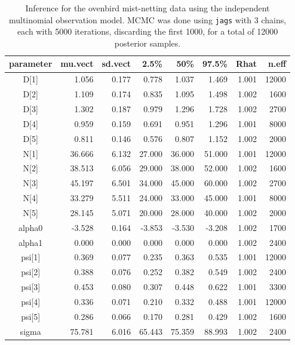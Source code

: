 \begin{table}[t!]
\centering
  \small
  \caption{Inference for the ovenbird mist-netting data using the
    independent multinomial observation model. MCMC was done using
    {\tt jags} with 3 chains, each with 5000 iterations, discarding
    the first 1000, for a total of 12000 posterior samples.}
  \begin{tabular}[t]{crrrrrrr}
    \hline \hline
parameter   &  mu.vect &  sd.vect &  2.5\%  &  50\%  &  97.5\%  & Rhat &  n.eff \\
    \hline
D[1] &   1.056  &  0.177 &  0.778 &  1.037 &  1.469 &  1.001 & 12000 \\
D[2] &    1.109 &  0.174 &  0.835 &  1.095 &  1.498 &  1.002 &  1600 \\
D[3] &    1.302 &  0.187 &  0.979 &  1.296 &  1.728 &  1.002 &  2700 \\
D[4] &    0.959 &  0.159 &  0.691 &  0.951 &  1.296 &  1.001 &  8000 \\
D[5] &    0.811 &  0.146 &  0.576 &  0.807 &  1.152 & 1.002  &  2000 \\
N[1] &   36.666 &  6.132 &  27.000 &  36.000 &  51.000 &  1.001 &  12000 \\
N[2] &   38.513 &  6.056 & 29.000  &  38.000 &  52.000 & 1.002 &  1600 \\
N[3] &   45.197 &  6.501 & 34.000 &  45.000  &  60.000 &  1.002 & 2700 \\
N[4] &   33.279 &  5.511 & 24.000 &  33.000  &  45.000 &  1.001 &  8000 \\
N[5] &   28.145 &  5.071 &  20.000 &  28.000 &  40.000 &  1.002 &  2000 \\
alpha0 &  -3.528 &   0.164 & -3.853 &  -3.530 &  -3.208 &  1.002 &  1700 \\
alpha1 &  0.000 &  0.000 &  0.000 &  0.000 &  0.000 &  1.002 &  2400 \\
psi[1] &  0.369 &  0.077 &  0.235 &  0.363 &   0.535 &  1.001 &  12000 \\
psi[2] &  0.388 &  0.076 &  0.252 &  0.382 &  0.549 &  1.002 &  2400 \\
psi[3] &  0.453 &  0.080 &  0.307 &  0.448 &  0.622 &  1.001 &  3300 \\
psi[4] &  0.336 &  0.071 &  0.210 &  0.332 &  0.488 &  1.001 &  12000 \\
psi[5] &  0.286 &  0.066 &  0.170 &  0.281 &  0.429 &  1.002  &  1600 \\
sigma  &  75.781 &  6.016 &  65.443 &  75.359 &  88.993 &  1.002 &  2400 \\
\hline
  \end{tabular}
  \label{scrovenbird.results}
\end {table}


